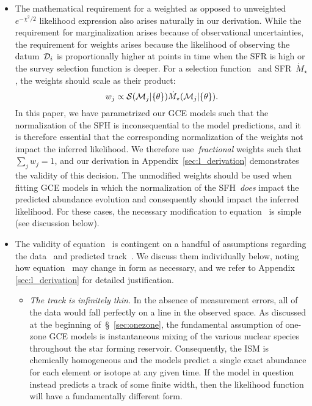 \documentclass[ms.tex]{subfiles}
\begin{document}
\begin{itemize}
	\item The mathematical requirement for a weighted as opposed to
	unweighted~$e^{-\chi^2/2}$ likelihood expression also arises naturally in
	our derivation.
	While the requirement for marginalization arises because of observational
	uncertainties, the requirement for weights arises because the likelihood of
	observing the datum~$\mathcal{D}_i$ is proportionally higher at points in
	time when the SFR is high or the survey selection function is deeper.
	For a selection function~ and SFR~$\dot{M}_\star$, the weights
	should scale as their product:
	\begin{equation}
	w_j \propto \mathcal{S}(\mathcal{M}_j | \{\theta\})
	\dot{M}_\star(\mathcal{M}_j | \{\theta\}).
	\label{eq:weights}
	\end{equation}
	In this paper, we have parametrized our GCE models such that the
	normalization of the SFH is inconsequential to the model predictions, and
	it is therefore essential that the corresponding normalization of the
	weights not impact the inferred likelihood.
	We therefore use~\textit{fractional} weights such that~$\sum_j w_j = 1$,
	and our derivation in Appendix~\ref{sec:l_derivation} demonstrates the
	validity of this decision.
	The unmodified weights should be used when fitting GCE models in which the
	normalization of the SFH~\textit{does} impact the predicted abundance
	evolution and consequently should impact the inferred likelihood.
	For these cases, the necessary modification to
	equation~ is simple (see discussion below).

	\item The validity of equation~ is contingent on a
	handful of assumptions regarding the data~ and predicted
	track~.
	We discuss them individually below, noting how equation~
	may change in form as necessary, and we refer to Appendix
	\ref{sec:l_derivation} for detailed justification.
	\begin{itemize}
		\item \textit{The track is infinitely thin.}
		In the absence of measurement errors, all of the data would fall
		perfectly on a line in the observed space.
		As discussed at the beginning of~\S~\ref{sec:onezone}, the
		fundamental assumption of one-zone GCE models is instantaneous mixing
		of the various nuclear species throughout the star forming reservoir.
		Consequently, the ISM is chemically homogeneous and the models predict
		a single exact abundance for each element or isotope at any given time.
		If the model in question instead predicts a track of some finite
		width, then the likelihood function will have a fundamentally different
		form.


\end{itemize}
\end{itemize}
\end{document}
